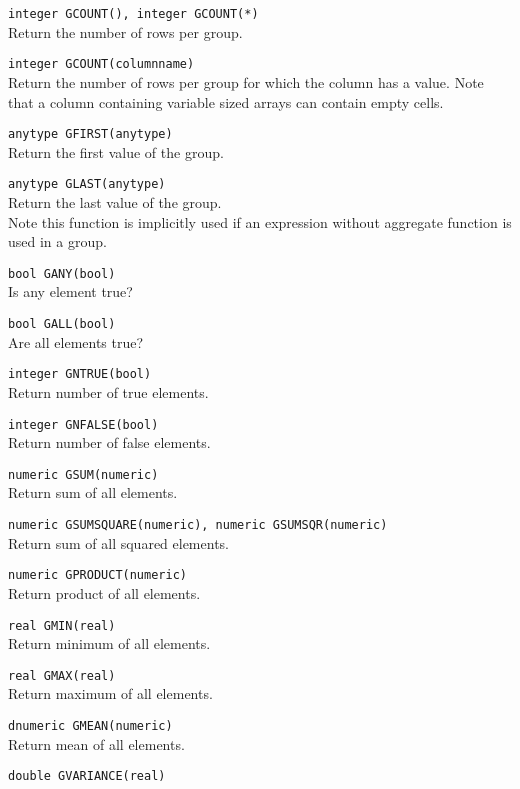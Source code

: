 \begin{description}
  \item[] \texttt{integer GCOUNT(), integer GCOUNT(*)}\\
    Return the number of rows per group.
  \item[] \texttt{integer GCOUNT(columnname)}\\
    Return the number of rows per group for which the column has a
    value. Note that a column containing variable sized arrays can
    contain empty cells.
  \item \texttt{anytype GFIRST(anytype)}\\
      Return the first value of the group.
  \item \texttt{anytype GLAST(anytype)}\\
      Return the last value of the group.
      \\Note this function is implicitly used if an expression without
      aggregate function is used in a group.
  \item[] \texttt{bool GANY(bool)}\\
    Is any element true?
  \item[] \texttt{bool GALL(bool)}\\
    Are all elements true?
  \item[] \texttt{integer GNTRUE(bool)}\\
    Return number of true elements.
  \item[] \texttt{integer GNFALSE(bool)}\\
    Return number of false elements.
  \item[] \texttt{numeric GSUM(numeric)}\\
    Return sum of all elements.
  \item[] \texttt{numeric GSUMSQUARE(numeric), numeric GSUMSQR(numeric)}\\
    Return sum of all squared elements.
  \item[] \texttt{numeric GPRODUCT(numeric)}\\
    Return product of all elements.
  \item[] \texttt{real GMIN(real)}\\
    Return minimum of all elements.
  \item[] \texttt{real GMAX(real)}\\
    Return maximum of all elements.
  \item[] \texttt{dnumeric GMEAN(numeric)}\\
    Return mean of all elements.
  \item[] \texttt{double GVARIANCE(real)}\\

\end{description}
